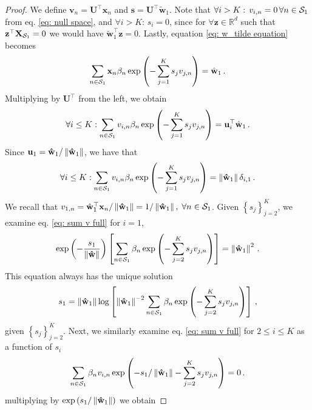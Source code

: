 \documentclass[twoside,11pt,english]{article}
\begin{document}
{\begin{proof}
We define $\mathbf{v}_{n}=\mathbf{U}^{\top}\mathbf{x}_{n}$ and $\mathbf{s}=\mathbf{U}^{\top}\tilde{\mathbf{w}}_{1}$.
Note that $\forall i>K:\,v_{i,n}=0\,\forall n\in\mathcal{S}_{1}$ from eq.
\ref{eq: null space}, and $\forall i>K:\,s_{i}=0$, since for $\forall\mathbf{z}\in\mathbb{R}^{d}$
such that $\mathbf{z}^{\top}\mathbf{X}_{\mathcal{S}_{1}}=0$ we would have
$\tilde{\mathbf{w}}_{1}^{\top}\mathbf{z}=0$. Lastly, equation \ref{eq: w_tilde equation}
becomes 
\begin{equation}
\sum_{n\in\mathcal{S}_{1}}\mathbf{x}_{n}\beta_{n}\exp\left(-\sum_{j=1}^{K}s_{j}v_{j,n}\right)=\hat{\mathbf{w}}_{1}\,.\label{eq: s equation}
\end{equation}
Multiplying by $\mathbf{U}^{\top}$ from the left, we obtain 
\[
\forall i\leq K:\sum_{n\in\mathcal{S}_{1}}v_{i,n}\beta_{n}\exp\left(-\sum_{j=1}^{K}s_{j}v_{j,n}\right)=\mathbf{u}_{i}^{\top}\hat{\mathbf{w}}_{1}\,.
\]
Since $\mathbf{u}_{1}=\mathbf{\hat{\mathbf{w}}}_{1}/\left\Vert \mathbf{\hat{\mathbf{w}}}_{1}\right\Vert $,
we have that 
\begin{equation}
\forall i\leq K:\sum_{n\in\mathcal{S}_{1}}v_{i,n}\beta_{n}\exp\left(-\sum_{j=1}^{K}s_{j}v_{j,n}\right)=\left\Vert \mathbf{\hat{\mathbf{w}}}_{1}\right\Vert \delta_{i,1}\,.\label{eq: sum v full}
\end{equation}
We recall that $v_{1,n}=\hat{\mathbf{w}}_{1}^{\top}\mathbf{x}_{n}/\left\Vert \mathbf{\hat{\mathbf{w}}}_{1}\right\Vert =1/\left\Vert \mathbf{\hat{\mathbf{w}}}_{1}\right\Vert ,$
$\forall n\in\mathcal{S}_{1}$. Given $\left\{ s_{j}\right\} _{j=2}^{K}$,
we examine eq. \ref{eq: sum v full} for $i=1$, 
\[
\exp\left(-\frac{s_{1}}{\left\Vert \mathbf{\hat{\mathbf{w}}}\right\Vert }\right)\left[\sum_{n\in\mathcal{S}_{1}}\beta_{n}\exp\left(-\sum_{j=2}^{K}s_{j}v_{j,n}\right)\right]=\left\Vert \mathbf{\hat{\mathbf{w}}}_{1}\right\Vert ^{2}\,.
\]
This equation always has the unique solution 
\begin{equation}
s_{1}=\left\Vert \mathbf{\hat{\mathbf{w}}}_{1}\right\Vert \log\left[\left\Vert \mathbf{\hat{\mathbf{w}}}_{1}\right\Vert ^{-2}\sum_{n\in\mathcal{S}_{1}}\beta_{n}\exp\left(-\sum_{j=2}^{K}s_{j}v_{j,n}\right)\right]\,,\label{eq: s1 solution}
\end{equation}
given $\left\{ s_{j}\right\} _{j=2}^{K}$. Next, we similarly examine
eq. \ref{eq: sum v full} for $2\leq i\leq K$ as a function of $s_{i}$
\begin{equation}
\sum_{n\in\mathcal{S}_{1}}\beta_{n}v_{i,n}\exp\left(-s_{1}/\left\Vert \mathbf{\hat{\mathbf{w}}}_{1}\right\Vert -\sum_{j=2}^{K}s_{j}v_{j,n}\right)=0\,.\label{eq: sum v i>1}
\end{equation}
multiplying by $\exp\left(s_{1}/\left\Vert \mathbf{\hat{\mathbf{w}}}_{1}\right\Vert \right)$
we obtain 

\end{proof}}
\end{document}
